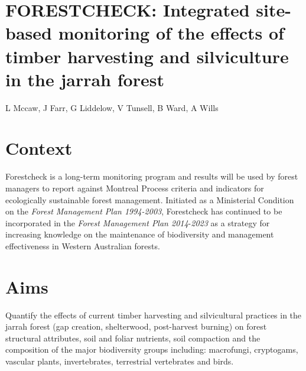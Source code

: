 \documentclass[version=last,
    paper=a4, %
    10pt, %
    usenames,
    dvipsnames,
    oneside, %
    headings=openany, %
    DIV=15 %
]{scrbook}
\begin{document}
\section*{FORESTCHECK: Integrated site-based monitoring of the effects of timber
harvesting and silviculture in the jarrah forest
}

L Mccaw, J Farr, G Liddelow, V Tunsell, B Ward, A Wills


\section*{Context}
Forestcheck is a long-term monitoring program and results will be used
by forest managers to report against Montreal Process criteria and
indicators for ecologically sustainable forest management. Initiated as
a Ministerial Condition on the \emph{Forest Management Plan 1994-2003},
Forestcheck has continued to be incorporated in the \emph{Forest
Management Plan 2014}-\emph{2023} as a strategy for increasing knowledge
on the maintenance of biodiversity and management effectiveness in
Western Australian forests.



\section*{Aims}
Quantify the effects of current timber harvesting and silvicultural
practices in the jarrah forest (gap creation, shelterwood, post-harvest
burning) on forest structural attributes, soil and foliar nutrients,
soil compaction and the composition of the major biodiversity groups
including: macrofungi, cryptogams, vascular plants, invertebrates,
terrestrial vertebrates and birds.
\end{document}
